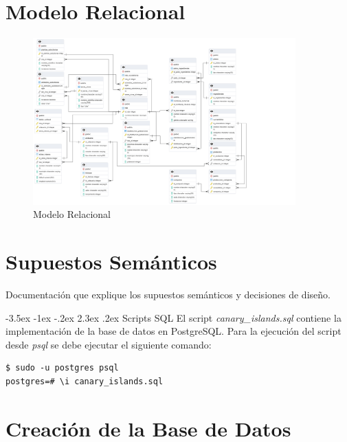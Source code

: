 \documentclass[11pt]{report}
\makeatletter
\renewcommand\chapter{\@startsection{chapter}{0}{\z@}%
    {-3.5ex \@plus -1ex \@minus -.2ex}%
    {2.3ex \@plus.2ex}%
    {\normalfont\Large\bfseries}}
\makeatother
\begin{document}
\section{Modelo Relacional}
\begin{figure}[H]
      \centering
      \includegraphics[width=0.9\textwidth]{../diagrams/RELACIONAL.png}
      \caption{Modelo Relacional}
      \label{fig:modelo_relacional}
\end{figure}

\section{Supuestos Semánticos}
Documentación que explique los supuestos semánticos y decisiones de diseño.

\chapter{Scripts SQL}
El script \emph{canary\_islands.sql} contiene la implementación de la base de datos en PostgreSQL. Para la ejecución
del script desde \emph{psql} se debe ejecutar el siguiente comando:
\begin{verbatim}
$ sudo -u postgres psql
postgres=# \i canary_islands.sql
\end{verbatim}

\newpage

\section{Creación de la Base de Datos}
\lstset{style=mystyle}

\end{document}
